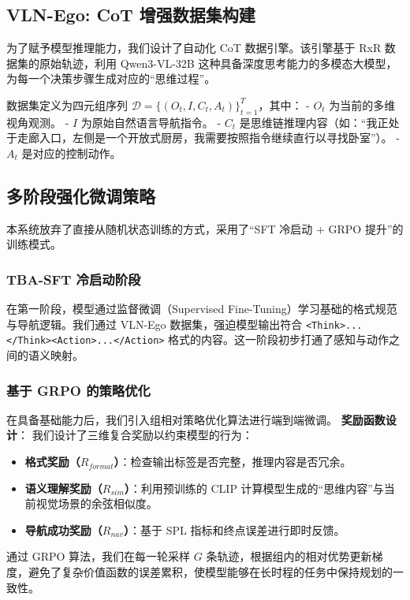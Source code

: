 \subsection{VLN-Ego: CoT 增强数据集构建}
为了赋予模型推理能力，我们设计了自动化 CoT 数据引擎。该引擎基于 RxR 数据集的原始轨迹，利用 Qwen3-VL-32B 这种具备深度思考能力的多模态大模型，为每一个决策步骤生成对应的“思维过程”。

数据集定义为四元组序列 $\mathcal{D} = \{ (O_t, I, C_t, A_t) \}_{t=1}^T$，其中：
- $O_t$ 为当前的多维视角观测。
- $I$ 为原始自然语言导航指令。
- $C_t$ 是思维链推理内容（如：“我正处于走廊入口，左侧是一个开放式厨房，我需要按照指令继续直行以寻找卧室”）。
- $A_t$ 是对应的控制动作。

\subsection{多阶段强化微调策略}
本系统放弃了直接从随机状态训练的方式，采用了“SFT 冷启动 + GRPO 提升”的训练模式。

\subsubsection{TBA-SFT 冷启动阶段}
在第一阶段，模型通过监督微调（Supervised Fine-Tuning）学习基础的格式规范与导航逻辑。我们通过 VLN-Ego 数据集，强迫模型输出符合 \texttt{<Think>...</Think><Action>...</Action>} 格式的内容。这一阶段初步打通了感知与动作之间的语义映射。

\subsubsection{基于 GRPO 的策略优化}
在具备基础能力后，我们引入组相对策略优化算法进行端到端微调。
\textbf{奖励函数设计}：
我们设计了三维复合奖励以约束模型的行为：
\begin{itemize}
    \item \textbf{格式奖励（$R_{format}$）}：检查输出标签是否完整，推理内容是否冗余。
    \item \textbf{语义理解奖励（$R_{sim}$）}：利用预训练的 CLIP 计算模型生成的“思维内容”与当前视觉场景的余弦相似度。
    \item \textbf{导航成功奖励（$R_{nav}$）}：基于 SPL 指标和终点误差进行即时反馈。
\end{itemize}

通过 GRPO 算法，我们在每一轮采样 $G$ 条轨迹，根据组内的相对优势更新梯度，避免了复杂价值函数的误差累积，使模型能够在长时程的任务中保持规划的一致性。
